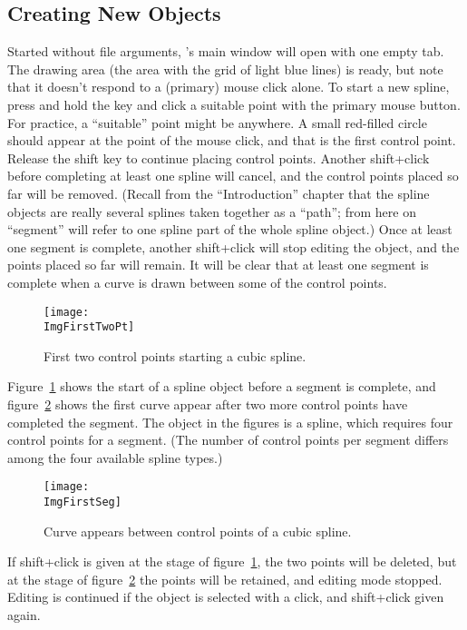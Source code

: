		\subsection{Creating New Objects}%
		Started without file arguments, \IXpkg{}'s
		main window will open with one empty tab.
		The drawing area (the area with the grid
		of light blue lines) is ready, but note that it
		doesn't respond to a (primary) mouse click alone. To start
		a new spline, press and hold the 
		key and click a suitable point with the primary
		mouse button. For practice, a ``suitable'' point
		might be anywhere. A small red-filled circle should
		appear at the point of the mouse click, and that is
		the first control point. Release the shift key to
		continue placing control points. Another shift+click
		before completing at least one spline 
		will cancel, and the control points placed so far will be
		removed. (Recall from the ``Introduction'' chapter
		that the spline objects are really several splines
		taken together as a ``path''; from here on ``segment''
		will refer to one spline part of the whole spline object.)
		Once at least one segment is complete, another
		shift+click will stop editing the object, and the points
		placed so far will remain.
		It will be clear that at least one segment is complete
		when a curve is drawn between some of the control points.
		
		\begin{figure}[htbp]
		\centering
		\texttt{[image: \\ImgFirstTwoPt]}
		\caption{First two control points starting a cubic spline.}
		\label{fig:first_two_points}
		\end{figure}
		
		Figure~\ref{fig:first_two_points} shows the start of a
		spline object before a segment is complete, and
		figure~\ref{fig:first_curve_between} shows the first
		curve appear after two more control points have completed
		the segment. The object in the figures is a 
		spline, which requires four control points for a segment.
		(The number of control points per segment differs among the
		four available spline types.) 
		
		\begin{figure}[htbp]
		\centering
		\texttt{[image: \\ImgFirstSeg]}
		\caption{Curve appears between control points of a cubic spline.}
		\label{fig:first_curve_between}
		\end{figure}

		If shift+click is given at the stage of
		figure~\ref{fig:first_two_points}, the two points will
		be deleted, but at the stage of
		figure~\ref{fig:first_curve_between} the points will
		be retained, and editing mode stopped. Editing
		is continued if the object is selected with a click,
		and shift+click given again.

